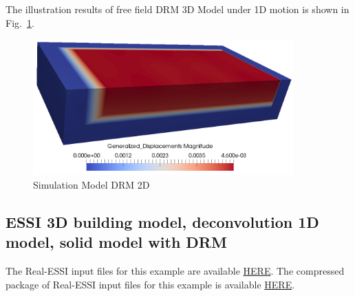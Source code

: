 The illustration results of free field DRM 3D Model under 1D motion is shown 
in Fig.~\ref{fig_day2_DRM3D_results}. 

\begin{figure}[H]
  \centering
  \includegraphics[width = 10cm]{./Figure-files/Day1/Preprocess_examples_with_Gmsh/example4/DRM3D_results.png}
  \caption{Simulation Model DRM 2D}
  \label{fig_day2_DRM3D_results}
\end{figure}



\clearpage
\newpage
\subsection{ESSI 3D building model, deconvolution 1D model, solid model with DRM}
\label{Earthquake_Soil-Structure_Interaction_3D_Model_with_DRM1}

The Real-ESSI input files for this example are available 
\href{http://sokocalo.engr.ucdavis.edu/~jeremic/lecture_notes_online_material/_Chapter_Short_Course_Examples/short-course-examples/Day2/Deconvolution_1D_Motions/Earthquake_Soil-Structure_Interaction_3D_Model_with_DRM}{HERE}. 
The compressed package of Real-ESSI input files for this example is available 
\href{http://sokocalo.engr.ucdavis.edu/~jeremic/lecture_notes_online_material/_Chapter_Short_Course_Examples/short-course-examples/Day2/Deconvolution_1D_Motions/Earthquake_Soil-Structure_Interaction_3D_Model_with_DRM/_all_files_packaged_for_Earthquake_Soil-Structure_Interaction_3D_Model_with_DRM.tar.gz}{HERE}. 

